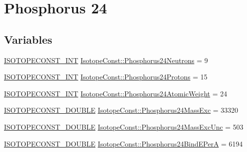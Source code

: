 \hypertarget{group___isotope_const-_phosphorus-_p24}{}\section{Phosphorus 24}
\label{group___isotope_const-_phosphorus-_p24}
\subsection*{Variables}
\begin{DoxyCompactItemize}
\item 
\mbox{\hyperlink{group___isotope_const-_macros_ga5f18360b3e99483a35c32d789e62621c}{I\+S\+O\+T\+O\+P\+E\+C\+O\+N\+S\+T\+\_\+\+I\+NT}} \mbox{\hyperlink{group___isotope_const-_phosphorus-_p24_ga5eb14453093e53462df978e6527a858e}{Isotope\+Const\+::\+Phosphorus24\+Neutrons}} = 9
\item 
\mbox{\hyperlink{group___isotope_const-_macros_ga5f18360b3e99483a35c32d789e62621c}{I\+S\+O\+T\+O\+P\+E\+C\+O\+N\+S\+T\+\_\+\+I\+NT}} \mbox{\hyperlink{group___isotope_const-_phosphorus-_p24_gaea95e3416e0c5fb7c9b1c971565ddc11}{Isotope\+Const\+::\+Phosphorus24\+Protons}} = 15
\item 
\mbox{\hyperlink{group___isotope_const-_macros_ga5f18360b3e99483a35c32d789e62621c}{I\+S\+O\+T\+O\+P\+E\+C\+O\+N\+S\+T\+\_\+\+I\+NT}} \mbox{\hyperlink{group___isotope_const-_phosphorus-_p24_gab0cbc8374ef5bfbd898d1c0a18e845ae}{Isotope\+Const\+::\+Phosphorus24\+Atomic\+Weight}} = 24
\item 
\mbox{\hyperlink{group___isotope_const-_macros_ga8f45a7272ce02c0b4c65c44636ed719a}{I\+S\+O\+T\+O\+P\+E\+C\+O\+N\+S\+T\+\_\+\+D\+O\+U\+B\+LE}} \mbox{\hyperlink{group___isotope_const-_phosphorus-_p24_ga2ab004091da2448bbebfe55433806e41}{Isotope\+Const\+::\+Phosphorus24\+Mass\+Exc}} = 33320
\item 
\mbox{\hyperlink{group___isotope_const-_macros_ga8f45a7272ce02c0b4c65c44636ed719a}{I\+S\+O\+T\+O\+P\+E\+C\+O\+N\+S\+T\+\_\+\+D\+O\+U\+B\+LE}} \mbox{\hyperlink{group___isotope_const-_phosphorus-_p24_gaccfaed1b62ce09132e5041e2878c8ca1}{Isotope\+Const\+::\+Phosphorus24\+Mass\+Exc\+Unc}} = 503
\item 
\mbox{\hyperlink{group___isotope_const-_macros_ga8f45a7272ce02c0b4c65c44636ed719a}{I\+S\+O\+T\+O\+P\+E\+C\+O\+N\+S\+T\+\_\+\+D\+O\+U\+B\+LE}} \mbox{\hyperlink{group___isotope_const-_phosphorus-_p24_ga1ffca3220e543b447e36ea9f89910de5}{Isotope\+Const\+::\+Phosphorus24\+Bind\+E\+PerA}} = 6194
\item 

\end{DoxyCompactItemize}
